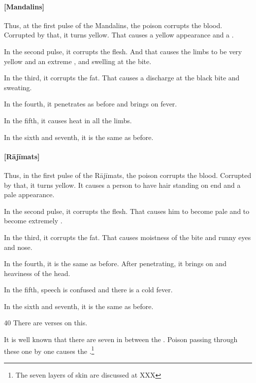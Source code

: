 \begin{translation}
    
\paragraph{[Mandalins]}    
Thus, at the first pulse of the Mandalins, the poison corrupts the blood.  
Corrupted by that, it turns yellow. That causes a yellow appearance and a 
.

In the second pulse, it corrupts the flesh.  And that causes the limbs to be very 
yellow and an extreme , and swelling at 
the bite.

In the third, it corrupts the fat.  That causes a discharge at the black bite and 
sweating.

In the fourth, it penetrates as before and brings on fever.

In the fifth, it causes heat in all the limbs. 

In the sixth and seventh, it is the same as before. 

\paragraph{[Rājīmats]}

Thus, in the first pulse of the Rājīmats, the poison corrupts the blood. 
Corrupted by that, it turns yellow.  It causes a person to have hair standing on 
end and a pale appearance. 

In the second pulse, it corrupts the flesh. That causes him to become pale and to 
become extremely .

In the third, it corrupts the fat.  That causes moistness of the bite and runny eyes 
and nose. 

In the fourth, it is the same as before.  After penetrating, it brings on 
 and heaviness of the head.

In the fifth, speech is confused and there is a cold fever.

In the sixth and seventh, it is the same as before. 



\item[40]
There are verses on this.

\begin{sloka}
It is well known that there are seven  in between the 
.  Poison passing through these one by one  
causes the .\footnote{The seven layers of skin
    are discussed at XXX}
\end{sloka}



\end{translation}
